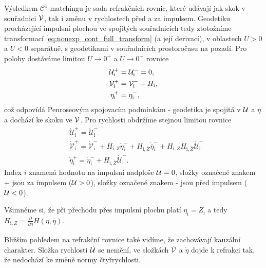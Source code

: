 Výsledkem $\mathcal{C}^1$-matchingu je sada refrakčních rovnic, které udávají jak skok v souřadnici $\mathcal{V}$,
tak i změnu v rychlostech před a za impulsem. Geodetiku procházející impulsní plochou ve spojitých souřadnicích tedy
ztotožníme transformací \eqref{eq:nonexp_cont_full_transform} (a její derivací), v oblastech $U > 0$ a $U < 0$ separátně, s geodetikami v souřadnicích prostoročasu na pozadí.
Pro polohy dostáváme limitou $U \to 0^+$ a $U \to 0^-$ rovnice
\begin{equation}
    \label{eq:refraction_nonexpanding_positions}
    \begin{split}
        \mathcal{U}^{+}_{\mathrm{i}} &= \mathcal{U}^{-}_{\mathrm{i}} = 0,\\
        \mathcal{V}^{+}_{\mathrm{i}} &= \mathcal{V}^{-}_{\mathrm{i}} + H_{\mathrm{i}},\\
        \eta^{+}_{\mathrm{i}} &= \eta^{-}_{\mathrm{i}},
    \end{split}
\end{equation}
což odpovídá Penroseovým spojovacím podmínkám - geodetika je spojitá v $\mathcal{U}$ a $\eta$ a dochází ke skoku ve $\mathcal{V}$.
Pro rychlosti obdržíme stejnou limitou rovnice
\begin{equation}
    \label{eq:refraction_nonexpanding_velocities}
    \begin{split}
        &\dot{\mathcal{U}}^{+}_{\mathrm{i}} = \dot{\mathcal{U}}^{-}_{\mathrm{i}}\\
        &\dot{\mathcal{V}}^{+}_{\mathrm{i}} = \dot{\mathcal{V}}_{\mathrm{i}}^{-} + H_{\mathrm{i}, Z}
        \dot{\eta}^{-}_{\mathrm{i}} + H_{\mathrm{i}, \bar{Z}} \dot{\overline{\eta}}^{-}_{\mathrm{i}} + 
        H_{\mathrm{i}, Z} H_{\mathrm{i}, \bar{Z}} \dot{\mathcal{U}}_{\mathrm{i}}^{-}\\
        &\dot{\eta}_{\mathrm{i}}^{+} =\dot{\eta}_{\mathrm{i}}^{-}+H_{\mathrm{i}, \bar{Z}}
        \dot{\mathcal{U}}_{\mathrm{i}}^{-}.
    \end{split}
\end{equation}
Index $i$ znamená hodnotu na impulsní nadploše $\mathcal{U} = 0$, složky označené znakem + jsou za impulsem ($\mathcal{U} > 0$),
složky označené znakem - jsou před impulsem ($\mathcal{U} <0$).

Všimněme si, že při přechodu přes impulsní plochu platí $\eta_{\mathrm{i}} = Z_{\mathrm{i}}$ a tedy $ H_{\mathrm{i},Z} = \frac{\partial}{\partial \eta} H(\eta, \bar{\eta})$.

Bližším pohledem na refrakční rovnice také vidíme, že zachovávají kauzální charakter. Složka rychlosti $\dot {\mathcal{U}}$ se
nemění, ve složkách $\dot {\mathcal{V}}$ a $\dot \eta$ dojde k refrakci tak, že nedochází ke změně normy čtyřrychlosti.


